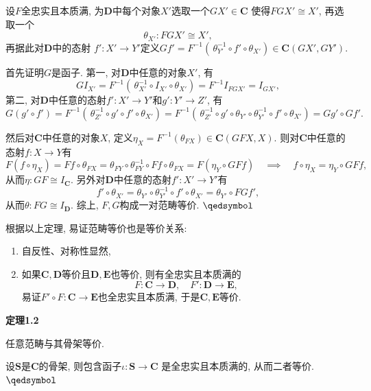 \documentclass[UTF8]{ctexart}
\begin{document}

设$F$全忠实且本质满, 为$\mathbf{D}$中每个对象$X'$选取一个$GX'\in\mathbf{C}$
使得$FGX'\cong X'$, 再选取一个
\[
    \theta_{X'}:FGX'\cong X',
\]
再据此对$\mathbf{D}$中的态射
$f':X'\to Y'$定义$Gf'=F^{-1}(\,\theta_{Y'}^{-1}\circ f'\circ \theta_{X'})\in
\mathbf{C}(GX',GY')$.

首先证明$G$是函子. 第一, 对$\mathbf{D}$中任意的对象$X'$, 有
\[
    GI_{X'}=F^{-1}(\,\theta_{X'}^{-1}\circ I_{X'}\circ \theta_{X'})=
    F^{-1}I_{FGX'}=I_{GX'},
\]
第二, 对$\mathbf{D}$中任意的态射$f':X'\to Y'$和$g':Y'\to Z'$, 有
\[
    G(g'\circ f')=F^{-1}(\,\theta_{Z'}^{-1}\circ g'\circ f'\circ \theta_{X'})=
    F^{-1}(\,\theta_{Z'}^{-1}\circ g'\circ \theta_{Y'}\circ \theta_{Y'}^{-1}\circ f'\circ \theta_{X'})=
    Gg'\circ Gf'.
\]

然后对$\mathbf{C}$中任意的对象$X$, 定义$\eta_X=F^{-1}(\theta_{FX})\in\mathbf{C}(GFX,X)$.
则对$\mathbf{C}$中任意的态射$f:X\to Y$有
\[
    F(f\circ\eta_X)=Ff\circ \theta_{FX}=\theta_{FY}\circ \theta_{FY}^{-1}\circ Ff\circ \theta_{FX}=
    F(\eta_Y\circ GFf)\quad\implies\quad f\circ\eta_X=\eta_Y\circ GFf,
\]
从而$\eta:GF\cong I_{\mathbf{C}}$. 另外对$\mathbf{D}$中任意的态射$f':X'\to Y'$有
\[
    f'\circ\theta_{X'}=\theta_{Y'}\circ\theta_{Y'}^{-1}\circ f'\circ\theta_{X'}=
    \theta_{Y'}\circ FGf',
\]
从而$\theta:FG\cong I_{\mathbf{D}}$. 综上, $F,G$构成一对范畴等价. \hfill $\qedsymbol$





\newpage

根据以上定理, 易证范畴等价也是等价关系:
\begin{enumerate}
    \item 自反性、对称性显然,
    \item 如果$\mathbf{C},\mathbf{D}$等价且$\mathbf{D},\mathbf{E}$也等价,
    则有全忠实且本质满的
    \[
        F:\mathbf{C}\to\mathbf{D},\quad F':\mathbf{D}\to\mathbf{E},
    \]
    易证$F'\circ F:\mathbf{C}\to\mathbf{E}$也全忠实且本质满,
    于是$\mathbf{C},\mathbf{E}$等价.
\end{enumerate}

\vspace{10pt}

\hypertarget{sec:定理1.2}{}
\noindent\textbf{定理1.2}

任意范畴与其骨架等价.


设$\mathbf{S}$是$\mathbf{C}$的骨架, 则包含函子$\iota:\mathbf{S}\to\mathbf{C}$
是全忠实且本质满的, 从而二者等价. \hfill $\qedsymbol$
\end{document}
